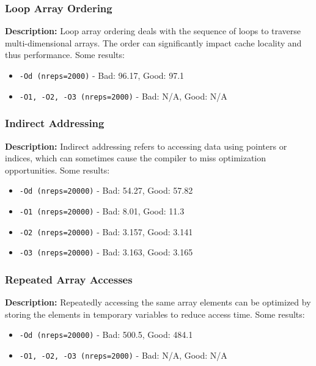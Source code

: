 \clearpage

\subsubsection{Loop Array Ordering}
\textbf{Description:} Loop array ordering deals with the sequence of loops to traverse multi-dimensional arrays. The order can significantly impact cache locality and thus performance. Some results:
\begin{itemize}[itemsep=0.3ex]
    \item \texttt{-Od (nreps=2000)} - Bad: 96.17, Good: 97.1
    \item \texttt{-O1, -O2, -O3 (nreps=2000)} - Bad: N/A, Good: N/A
\end{itemize}

\subsubsection{Indirect Addressing}
\textbf{Description:} Indirect addressing refers to accessing data using pointers or indices, which can sometimes cause the compiler to miss optimization opportunities. Some results:
\begin{itemize}[itemsep=0.3ex]
    \item \texttt{-Od (nreps=20000)} - Bad: 54.27, Good: 57.82
    \item \texttt{-O1 (nreps=20000)} - Bad: 8.01, Good: 11.3
    \item \texttt{-O2 (nreps=20000)} - Bad: 3.157, Good: 3.141
    \item \texttt{-O3 (nreps=20000)} - Bad: 3.163, Good: 3.165
\end{itemize}

\subsubsection{Repeated Array Accesses}
\textbf{Description:} Repeatedly accessing the same array elements can be optimized by storing the elements in temporary variables to reduce access time. Some results:
\begin{itemize}[itemsep=0.3ex]
    \item \texttt{-Od (nreps=20000)} - Bad: 500.5, Good: 484.1
    \item \texttt{-O1, -O2, -O3 (nreps=2000)} - Bad: N/A, Good: N/A
\end{itemize}

